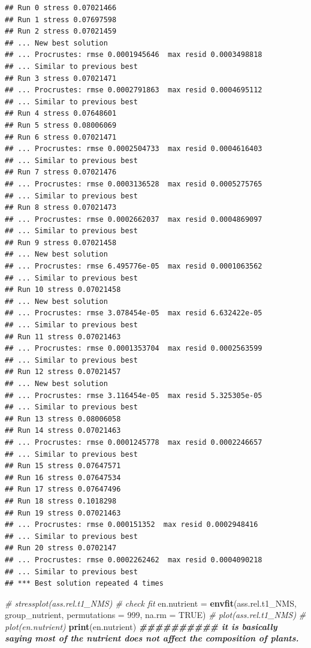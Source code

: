 \documentclass[
]{article}
\newenvironment{Shaded}{\begin{snugshade}}{\end{snugshade}}
\newcommand{\AttributeTok}[1]{\textcolor[rgb]{0.13,0.29,0.53}{#1}}
\newcommand{\CommentTok}[1]{\textcolor[rgb]{0.56,0.35,0.01}{\textit{#1}}}
\newcommand{\ConstantTok}[1]{\textcolor[rgb]{0.56,0.35,0.01}{#1}}
\newcommand{\DecValTok}[1]{\textcolor[rgb]{0.00,0.00,0.81}{#1}}
\newcommand{\DocumentationTok}[1]{\textcolor[rgb]{0.56,0.35,0.01}{\textbf{\textit{#1}}}}
\newcommand{\FunctionTok}[1]{\textcolor[rgb]{0.13,0.29,0.53}{\textbf{#1}}}
\newcommand{\NormalTok}[1]{#1}
\newcommand{\OtherTok}[1]{\textcolor[rgb]{0.56,0.35,0.01}{#1}}
\begin{document}
\begin{verbatim}
## Run 0 stress 0.07021466 
## Run 1 stress 0.07697598 
## Run 2 stress 0.07021459 
## ... New best solution
## ... Procrustes: rmse 0.0001945646  max resid 0.0003498818 
## ... Similar to previous best
## Run 3 stress 0.07021471 
## ... Procrustes: rmse 0.0002791863  max resid 0.0004695112 
## ... Similar to previous best
## Run 4 stress 0.07648601 
## Run 5 stress 0.08006069 
## Run 6 stress 0.07021471 
## ... Procrustes: rmse 0.0002504733  max resid 0.0004616403 
## ... Similar to previous best
## Run 7 stress 0.07021476 
## ... Procrustes: rmse 0.0003136528  max resid 0.0005275765 
## ... Similar to previous best
## Run 8 stress 0.07021473 
## ... Procrustes: rmse 0.0002662037  max resid 0.0004869097 
## ... Similar to previous best
## Run 9 stress 0.07021458 
## ... New best solution
## ... Procrustes: rmse 6.495776e-05  max resid 0.0001063562 
## ... Similar to previous best
## Run 10 stress 0.07021458 
## ... New best solution
## ... Procrustes: rmse 3.078454e-05  max resid 6.632422e-05 
## ... Similar to previous best
## Run 11 stress 0.07021463 
## ... Procrustes: rmse 0.0001353704  max resid 0.0002563599 
## ... Similar to previous best
## Run 12 stress 0.07021457 
## ... New best solution
## ... Procrustes: rmse 3.116454e-05  max resid 5.325305e-05 
## ... Similar to previous best
## Run 13 stress 0.08006058 
## Run 14 stress 0.07021463 
## ... Procrustes: rmse 0.0001245778  max resid 0.0002246657 
## ... Similar to previous best
## Run 15 stress 0.07647571 
## Run 16 stress 0.07647534 
## Run 17 stress 0.07647496 
## Run 18 stress 0.1018298 
## Run 19 stress 0.07021463 
## ... Procrustes: rmse 0.000151352  max resid 0.0002948416 
## ... Similar to previous best
## Run 20 stress 0.0702147 
## ... Procrustes: rmse 0.0002262462  max resid 0.0004090218 
## ... Similar to previous best
## *** Best solution repeated 4 times
\end{verbatim}

\begin{Shaded}
\begin{Highlighting}[]
\CommentTok{\# stressplot(ass.rel.t1\_NMS) \# check fit}
\NormalTok{en.nutrient }\OtherTok{=} \FunctionTok{envfit}\NormalTok{(ass.rel.t1\_NMS, group\_nutrient, }\AttributeTok{permutations =} \DecValTok{999}\NormalTok{, }\AttributeTok{na.rm =} \ConstantTok{TRUE}\NormalTok{)}
\CommentTok{\# plot(ass.rel.t1\_NMS) }
\CommentTok{\# plot(en.nutrient)}
\FunctionTok{print}\NormalTok{(en.nutrient) }\DocumentationTok{\#\#\#\#\#\#\#\#\#\# it is basically saying most of the nutrient does not affect the composition of plants.}
\end{Highlighting}
\end{Shaded}
\end{document}

